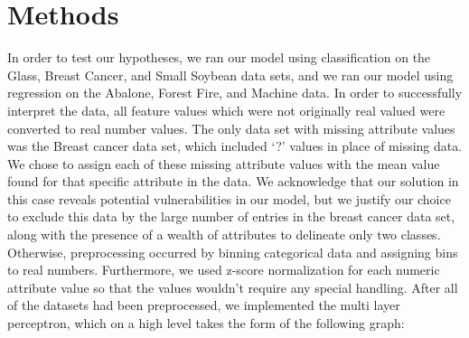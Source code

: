 \documentclass[twoside,11pt]{article}
\begin{document}
\section{Methods}
In order to test our hypotheses, we ran our model using classification on the Glass, Breast Cancer, and Small Soybean data sets, and 
we ran our model using regression on the Abalone, Forest Fire, and Machine data. In order to successfully interpret the data, all feature values
which were not originally real valued were converted to real number values. The only data set with missing attribute values was the Breast cancer
data set, which included `?' values in place of missing data. We chose to assign each of these missing attribute values with the mean value found for 
that specific attribute in the data. We acknowledge that our
solution in this case reveals potential vulnerabilities in our model, but we justify our choice to exclude this data by the large number of entries in the breast
cancer data set, along with the presence of a wealth of attributes to delineate only two classes. 
Otherwise, preprocessing occurred by binning categorical data and assigning bins to real numbers. Furthermore, we used z-score normalization 
for each numeric attribute value so that the values wouldn't require any special handling.
After all of the datasets had been preprocessed, we implemented the multi
layer perceptron, which on a high level takes the form of the following graph:
\end{document}
